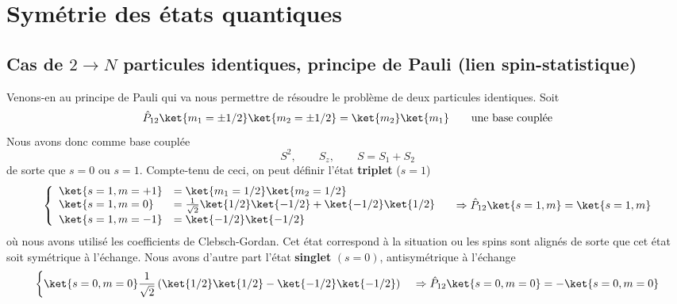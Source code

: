\section{Symétrie des états quantiques}
\subsection{Cas de $2\to N$ particules identiques, principe de Pauli (lien spin-statistique)}
Venons-en au principe de Pauli qui va nous permettre de résoudre le problème de deux particules 
identiques.  Soit
\begin{equation}
\hat{P}_{12}\ket{m_1=\pm1/2}\ket{m_2=\pm1/2} = \ket{m_2}\ket{m_1}\qquad\text{une base couplée}
\end{equation}
Nous avons donc comme base couplée
\begin{equation}
S^2,\qquad S_z,\qquad S = S_1+S_2
\end{equation}
de sorte que $s=0$ ou $s=1$. Compte-tenu de ceci, on peut définir l'état \textbf{triplet} ($s=1$)
\begin{equation}
\left\{\begin{array}{ll}
\ket{s=1,m=+1} &= \ket{m_1=1/2}\ket{m_2=1/2}\\
\ket{s=1,m=0} &= \frac{1}{\sqrt{2}}\ket{1/2}\ket{-1/2}+\ket{-1/2}\ket{1/2}\\
\ket{s=1,m=-1} &= \ket{-1/2}\ket{-1/2}
\end{array}\right.\quad \Rightarrow \hat{P}_{12}\ket{s=1,m} = \ket{s=1,m}
\end{equation}
où nous avons utilisé les coefficients de Clebsch-Gordan. Cet état correspond à la situation ou 
les spins sont alignés de sorte que cet état soit symétrique à l'échange. Nous avons d'autre 
part l'état \textbf{singlet} $(s=0)$, antisymétrique à l'échange
\begin{equation}
\left\{ \ket{s=0, m=0} \frac{1}{\sqrt{2}}\left(\ket{1/2}\ket{1/2} - \ket{-1/2}\ket{-1/2}\right)\right.
\quad \Rightarrow \hat{P}_{12}\ket{s=0,m=0} = -\ket{s=0,m=0}
\end{equation}


